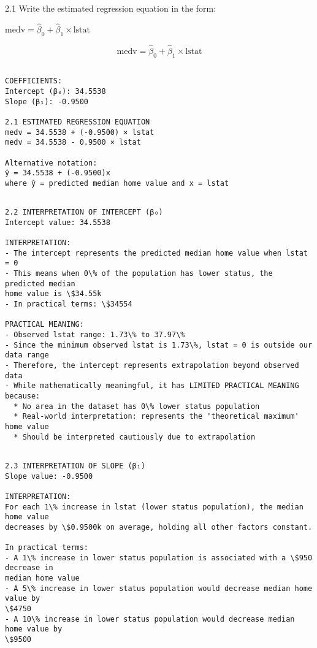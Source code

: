 \documentclass[11pt, twocolumn]{article}
\begin{document}
    2.1 Write the estimated regression equation in the form:

\(\text{medv} = \hat{\beta}_0 + \hat{\beta}_1 \times \text{lstat}\)

\[
\text{medv} = \hat{\beta}_0 + \hat{\beta}_1 \times \text{lstat}
\]

    \begin{Verbatim}[commandchars=\\\{\}]

COEFFICIENTS:
Intercept (β₀): 34.5538
Slope (β₁): -0.9500

2.1 ESTIMATED REGRESSION EQUATION
medv = 34.5538 + (-0.9500) × lstat
medv = 34.5538 - 0.9500 × lstat

Alternative notation:
ŷ = 34.5538 + (-0.9500)x
where ŷ = predicted median home value and x = lstat
    \end{Verbatim}

    \begin{Verbatim}[commandchars=\\\{\}]

2.2 INTERPRETATION OF INTERCEPT (β₀)
Intercept value: 34.5538

INTERPRETATION:
- The intercept represents the predicted median home value when lstat = 0
- This means when 0\% of the population has lower status, the predicted median
home value is \$34.55k
- In practical terms: \$34554

PRACTICAL MEANING:
- Observed lstat range: 1.73\% to 37.97\%
- Since the minimum observed lstat is 1.73\%, lstat = 0 is outside our data range
- Therefore, the intercept represents extrapolation beyond observed data
- While mathematically meaningful, it has LIMITED PRACTICAL MEANING because:
  * No area in the dataset has 0\% lower status population
  * Real-world interpretation: represents the 'theoretical maximum' home value
  * Should be interpreted cautiously due to extrapolation
    \end{Verbatim}

    \begin{Verbatim}[commandchars=\\\{\}]

2.3 INTERPRETATION OF SLOPE (β₁)
Slope value: -0.9500

INTERPRETATION:
For each 1\% increase in lstat (lower status population), the median home value
decreases by \$0.9500k on average, holding all other factors constant.

In practical terms:
- A 1\% increase in lower status population is associated with a \$950 decrease in
median home value
- A 5\% increase in lower status population would decrease median home value by
\$4750
- A 10\% increase in lower status population would decrease median home value by
\$9500
    \end{Verbatim}
\end{document}
